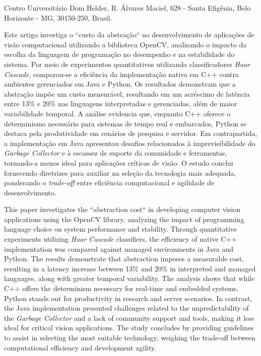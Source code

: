 \documentclass[portuguese]{sbc2025}%
\begin{document}

\begin{frontmatter}

\maketitle

\begin{mail}
Centro Universitário Dom Helder,  R. Álvares Maciel, 628 - Santa Efigênia, Belo Horizonte - MG, 30150-250, Brasil. 
\end{mail}

\begin{abstract-pt}
Este artigo investiga o ``custo da abstração`` no desenvolvimento de aplicações de visão computacional utilizando a biblioteca OpenCV, analisando o impacto da escolha da linguagem de programação no desempenho e na estabilidade do sistema. Por meio de experimentos quantitativos utilizando classificadores \textit{Haar Cascade}, comparou-se a eficiência da implementação nativa em C++ contra ambientes gerenciados em Java e Python. Os resultados demonstram que a abstração impõe um custo mensurável, resultando em um acréscimo de latência entre 13\% e 20\% nas linguagens interpretadas e gerenciadas, além de maior variabilidade temporal. A análise evidencia que, enquanto C++ oferece o determinismo necessário para sistemas de tempo real e embarcados, Python se destaca pela produtividade em cenários de pesquisa e servidor. Em contrapartida, a implementação em Java apresentou desafios relacionados à imprevisibilidade do \textit{Garbage Collector} e à escassez de suporte da comunidade e ferramentas, tornando-a menos ideal para aplicações críticas de visão. O estudo conclui fornecendo diretrizes para auxiliar na seleção da tecnologia mais adequada, ponderando o \textit{trade-off} entre eficiência computacional e agilidade de desenvolvimento.
\end{abstract-pt}

\begin{abstract-en}
This paper investigates the ``abstraction cost`` in developing computer vision applications using the OpenCV library, analyzing the impact of programming language choice on system performance and stability. Through quantitative experiments utilizing \textit{Haar Cascade} classifiers, the efficiency of native C++ implementation was compared against managed environments in Java and Python. The results demonstrate that abstraction imposes a measurable cost, resulting in a latency increase between 13\% and 20\% in interpreted and managed languages, along with greater temporal variability. The analysis shows that while C++ offers the determinism necessary for real-time and embedded systems, Python stands out for productivity in research and server scenarios. In contrast, the Java implementation presented challenges related to the unpredictability of the \textit{Garbage Collector} and a lack of community support and tools, making it less ideal for critical vision applications. The study concludes by providing guidelines to assist in selecting the most suitable technology, weighing the trade-off between computational efficiency and development agility.
\end{abstract-en}


\end{frontmatter}
\end{document}
